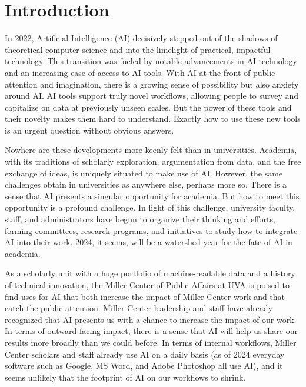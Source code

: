 \documentclass[12pt, oneside]{article}   	%
\begin{document}
\pagebreak 

\section{Introduction}\label{section.introduction}
In 2022, Artificial Intelligence (AI) decisively stepped out of the shadows of theoretical computer science and into the limelight of practical, impactful technology. This transition was fueled by notable advancements in AI technology and an increasing ease of access to AI tools.  With AI at the front of public attention and imagination, there is a growing sense of possibility but also anxiety around AI.  AI tools support truly novel workflows, allowing people to survey and capitalize on data at previously unseen scales.  But the power of these tools and their novelty makes them hard to understand.  Exactly how to use these new tools is an urgent question without obvious answers.

Nowhere are these developments more keenly felt than in universities.  Academia, with its traditions of scholarly exploration, argumentation from data, and the free exchange of ideas, is uniquely situated to make use of AI.  However, the same challenges obtain in universities as anywhere else, perhaps more so.  There is a sense that AI presents a singular opportunity for academia.  But how to meet this opportunity is a profound challenge.  In light of this challenge, university faculty, staff, and administrators have begun to organize their thinking and efforts, forming committees, research programs, and initiatives to study how to integrate AI into their work.  2024, it seems, will be a watershed year for the fate of AI in academia.

As a scholarly unit with a huge portfolio of machine-readable data and a history of technical innovation, the Miller Center of Public Affairs at UVA is poised to find uses for AI that both increase the impact of Miller Center work and that catch the public attention.   Miller Center leadership and staff have already recognized that AI presents us with a chance to increase the impact of our work.  In terms of outward-facing impact, there is a sense that AI will help us share our results more broadly than we could before.  In terms of internal workflows, Miller Center scholars and staff already use AI on a daily basis (as of 2024 everyday software such as Google, MS Word, and Adobe Photoshop all use AI), and it seems unlikely that the footprint of AI on our workflows to shrink.
\end{document}
